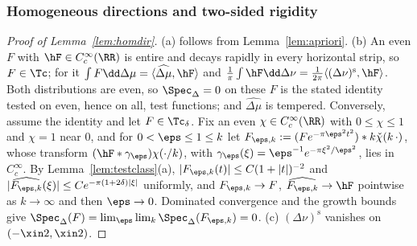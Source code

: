 \subsubsection{Homogeneous directions and two-sided rigidity}\label{app:proofs-rigidity}
\begin{proof}[Proof of Lemma~\textup{\ref{lem:homdir}}]
(a) follows from Lemma~\ref{lem:apriori}. (b) An even $F$ with $\hF\in C_c^\infty(\RR)$ is entire and decays rapidly in
every horizontal strip, so $F\in\Tc$; for it $\int F\dd\Delta\mu=\langle\widehat{\Delta\mu},\hF\rangle$ and
$\frac1\pi\int\hF\dd\Delta\nu=\frac1{2\pi}\langle(\Delta\nu)^{\mathrm s},\hF\rangle$. Both distributions are even, so
$\Spec_\Delta=0$ on these $F$ is the stated identity tested on even, hence on all, test functions; and
$\widehat{\Delta\mu}$ is tempered. Conversely, assume the identity and let $F\in\Tc_\delta$. Fix an even $\chi\in C_c^\infty(\RR)$ with
$0\le\chi\le1$ and $\chi=1$ near $0$, and for $0<\eps\le1\le k$ let $F_{\eps,k}:=(Fe^{-\pi\eps^2t^2})*k\check\chi(k\,\cdot)$, whose transform
$(\hF*\gamma_\eps)\chi(\cdot/k)$, with $\gamma_\eps(\xi)=\eps^{-1}e^{-\pi\xi^2/\eps^2}$, lies in $C_c^\infty$. By Lemma~\ref{lem:testclass}(a),
$|F_{\eps,k}(t)|\le C(1+|t|)^{-2}$ and $|\widehat{F_{\eps,k}}(\xi)|\le Ce^{-\pi(1+2\delta)|\xi|}$ uniformly, and $F_{\eps,k}\to F$,
$\widehat{F_{\eps,k}}\to\hF$ pointwise as $k\to\infty$ and then $\eps\to0$. Dominated convergence and the growth bounds give
$\Spec_\Delta(F)=\lim_\eps\lim_k\Spec_\Delta(F_{\eps,k})=0$. (c) $(\Delta\nu)^{\mathrm s}$ vanishes on
$(-\xin2,\xin2)$.
\end{proof}

